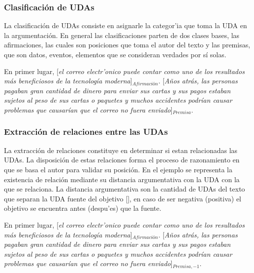 \subsubsection{Clasificación de UDAs}

La clasificación de UDAs consiste en asignarle la categor'ia que toma la UDA en la argumentación. En general 
las clasificaciones parten de dos clases bases, las afirmaciones, las cuales son posiciones que toma el 
autor del texto y las premisas, que son datos, eventos, elementos que se consideran verdades por sí solas.  

\begin{adjustwidth}{25pt}{25pt}
    En primer lugar, [\emph{el correo electr'onico puede contar como uno de los resultados
    más beneficiosos de la tecnología moderna}]$_{Afirmación}$. [\emph{Años atrás, las personas pagaban gran cantidad de dinero para 
    enviar sus cartas y sus pagos estaban sujetos al peso de sus cartas o paquetes y muchos accidentes podrían 
    causar problemas que causarían que el correo no fuera enviado}]$_{Premisa}$.
\end{adjustwidth}

\subsubsection{Extracción de relaciones entre las UDAs}

La extracción de relaciones constituye en determinar si estan relacionadas las UDAs. La disposición de estas
relaciones forma el proceso de razonamiento en que se basa el autor para validar su posición. En el ejemplo 
se representa la existencia de relación mediante su distancia argumentativa con la UDA con la que se relaciona.
La distancia argumentativa son la cantidad de UDAs del texto que separan la UDA fuente del objetivo [\cite{galassi2018argumentative}], 
en caso de ser negativa (positiva) el objetivo se encuentra antes (despu'es) que la fuente.

\begin{adjustwidth}{25pt}{25pt}
    En primer lugar, [\emph{el correo electr'onico puede contar como uno de los resultados
    más beneficiosos de la tecnología moderna}]$_{Afirmación}$. [\emph{Años atrás, las personas pagaban gran cantidad de dinero para 
    enviar sus cartas y sus pagos estaban sujetos al peso de sus cartas o paquetes y muchos accidentes podrían 
    causar problemas que causarían que el correo no fuera enviado}]$_{Premisa, -1}$.
\end{adjustwidth}

